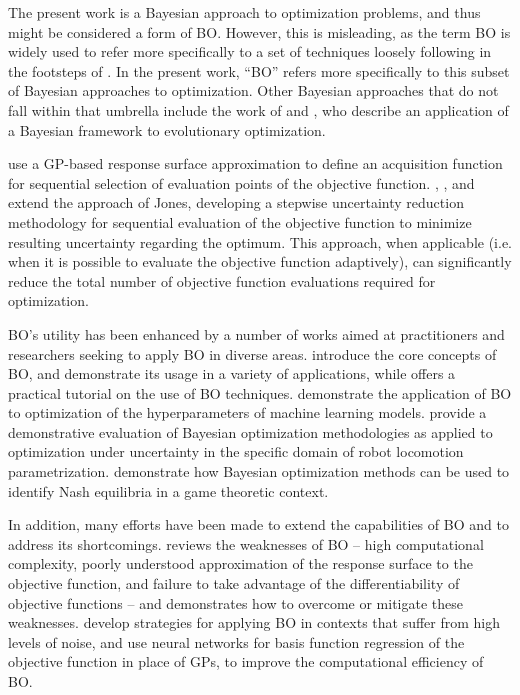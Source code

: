 \documentclass[12pt]{article}
\begin{document}
The present work is a Bayesian approach to optimization problems, and thus might be considered a form of BO.
However, this is misleading, as the term BO is widely used to refer more specifically to a set of techniques loosely following in the footsteps of \citet{Jones1998}.
In the present work, ``BO'' refers more specifically to this subset of Bayesian approaches to optimization.
Other Bayesian approaches that do not fall within that umbrella include the work of \citet{Pelikan1999} and \citet{Pelikan2005}, who describe an application of a Bayesian framework to evolutionary optimization.

\citet{Jones1998} use a GP-based response surface approximation to define an acquisition function for sequential selection of evaluation points of the objective function.
\citet{Vazquez2009}, \citet{Bect2012}, and \citet{Chevalier2014} extend the approach of Jones, developing a stepwise uncertainty reduction methodology for sequential evaluation of the objective function to minimize resulting uncertainty regarding the optimum.
This approach, when applicable (i.e. when it is possible to evaluate the objective function adaptively), can significantly reduce the total number of objective function evaluations required for optimization.

BO's utility has been enhanced by a number of works aimed at practitioners and researchers seeking to apply BO in diverse areas.
\citet{Shahriari2016} introduce the core concepts of BO, and demonstrate its usage in a variety of applications, while \citet{Frazier2018} offers a practical tutorial on the use of BO techniques.
\citet{Snoek2012} demonstrate the application of BO to optimization of the hyperparameters of machine learning models.
\citet{Calandra2016} provide a demonstrative evaluation of Bayesian optimization methodologies as applied to optimization under uncertainty in the specific domain of robot locomotion parametrization.
\citet{Picheny2019} demonstrate how Bayesian optimization methods can be used to identify Nash equilibria in a game theoretic context.

In addition, many efforts have been made to extend the capabilities of BO and to address its shortcomings.
\citet{Lizotte2008} reviews the weaknesses of BO -- high computational complexity, poorly understood approximation of the response surface to the objective function, and failure to take advantage of the differentiability of objective functions -- and demonstrates how to overcome or mitigate these weaknesses.
\citet{Letham2019} develop strategies for applying BO in contexts that suffer from high levels of noise, and \citet{Snoek2015} use neural networks for basis function regression of the objective function in place of GPs, to improve the computational efficiency of BO.
\end{document}
